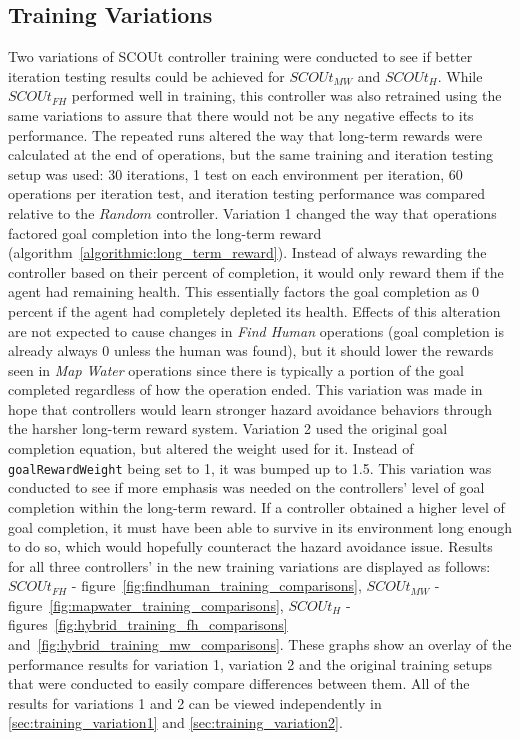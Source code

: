 \subsection{Training Variations} \label{subsec:training_variations}
Two variations of SCOUt controller training were conducted to see if better iteration testing results could be achieved for $SCOUt_{MW}$ and $SCOUt_{H}$.
While $SCOUt_{FH}$ performed well in training, this controller was also retrained using the same variations to assure that there would not be any negative effects to its performance.
The repeated runs altered the way that long-term rewards were calculated at the end of operations, but the same training and iteration testing setup was used: 30 iterations, 1 test on each environment per iteration, 60 operations per iteration test, and iteration testing performance was compared relative to the $Random$ controller.
Variation 1 changed the way that operations factored goal completion into the long-term reward (algorithm~\ref{algorithmic:long_term_reward}).
Instead of always rewarding the controller based on their percent of completion, it would only reward them if the agent had remaining health.
This essentially factors the goal completion as 0 percent if the agent had completely depleted its health.
Effects of this alteration are not expected to cause changes in \textit{Find Human} operations (goal completion is already always 0 unless the human was found), but it should lower the rewards seen in \textit{Map Water} operations since there is typically a portion of the goal completed regardless of how the operation ended.
This variation was made in hope that controllers would learn stronger hazard avoidance behaviors through the harsher long-term reward system.
Variation 2 used the original goal completion equation, but altered the weight used for it.
Instead of \texttt{goalRewardWeight} being set to 1, it was bumped up to 1.5.
This variation was conducted to see if more emphasis was needed on the controllers' level of goal completion within the long-term reward.
If a controller obtained a higher level of goal completion, it must have been able to survive in its environment long enough to do so, which would hopefully counteract the hazard avoidance issue.
Results for all three controllers' in the new training variations are displayed as follows: $SCOUt_{FH}$ - figure~\ref{fig:findhuman_training_comparisons}, $SCOUt_{MW}$ - figure~\ref{fig:mapwater_training_comparisons}, $SCOUt_{H}$ - figures~\ref{fig:hybrid_training_fh_comparisons} and~\ref{fig:hybrid_training_mw_comparisons}.
These graphs show an overlay of the performance results for variation 1, variation 2 and the original training setups that were conducted to easily compare differences between them.
All of the results for variations 1 and 2 can be viewed independently in \ref{sec:training_variation1} and \ref{sec:training_variation2}.


